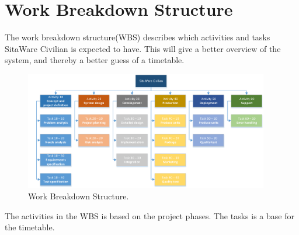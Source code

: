 \chapter{Work Breakdown Structure}
\label{chap:wbs}

The work breakdown structure(WBS) describes which activities and tasks SitaWare Civilian is expected to have. This will give a better overview of the system, and thereby a better guess of a timetable.

\begin{figure}[H]
\centering
\includegraphics[width=0.95\textwidth]
{Billeder/WBS/WBS_v1.0.pdf}
\caption{Work Breakdown Structure.}
\label{fig:WBS}
\end{figure}

The activities in the WBS is based on the project phases. The tasks is a base for the timetable.

